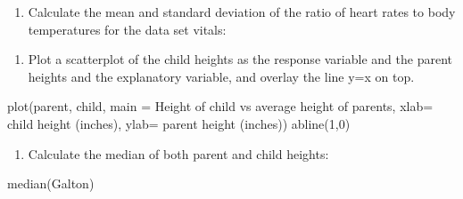 \documentclass[
  letterpaper,
  DIV=11,
  numbers=noendperiod]{scrreprt}
\newenvironment{Shaded}{\begin{snugshade}}{\end{snugshade}}
\newcommand{\AttributeTok}[1]{\textcolor[rgb]{0.40,0.45,0.13}{#1}}
\newcommand{\DecValTok}[1]{\textcolor[rgb]{0.68,0.00,0.00}{#1}}
\newcommand{\FunctionTok}[1]{\textcolor[rgb]{0.28,0.35,0.67}{#1}}
\newcommand{\NormalTok}[1]{\textcolor[rgb]{0.00,0.23,0.31}{#1}}
\newcommand{\SpecialCharTok}[1]{\textcolor[rgb]{0.37,0.37,0.37}{#1}}
\newcommand{\StringTok}[1]{\textcolor[rgb]{0.13,0.47,0.30}{#1}}
\providecommand{\tightlist}{%
  \setlength{\itemsep}{0pt}\setlength{\parskip}{0pt}}\usepackage{longtable,booktabs,array}
\begin{document}
\begin{enumerate}
\def\labelenumi{\arabic{enumi}.}
\setcounter{enumi}{1}
\tightlist
\item
  Calculate the mean and standard deviation of the ratio of heart rates
  to body temperatures for the data set vitals:
\end{enumerate}

\begin{Shaded}
\end{Shaded}

\begin{enumerate}
\def\labelenumi{\arabic{enumi}.}
\setcounter{enumi}{2}
\tightlist
\item
  Plot a scatterplot of the child heights as the response variable and
  the parent heights and the explanatory variable, and overlay the line
  y=x on top.
\end{enumerate}

\begin{Shaded}
\begin{Highlighting}[]
\FunctionTok{plot}\NormalTok{(parent, child, }\AttributeTok{main =} \StringTok{\textquotesingle{}Height of child vs average height of parents\textquotesingle{}}\NormalTok{, }\AttributeTok{xlab=} \StringTok{\textquotesingle{}child height (inches)\textquotesingle{}}\NormalTok{, }\AttributeTok{ylab=} \StringTok{\textquotesingle{}parent height (inches)\textquotesingle{}}\NormalTok{)}
\FunctionTok{abline}\NormalTok{(}\DecValTok{1}\NormalTok{,}\DecValTok{0}\NormalTok{)}
\end{Highlighting}
\end{Shaded}

\begin{enumerate}
\def\labelenumi{\arabic{enumi}.}
\setcounter{enumi}{3}
\tightlist
\item
  Calculate the median of both parent and child heights:
\end{enumerate}

\begin{Shaded}
\begin{Highlighting}[]
\FunctionTok{median}\NormalTok{(Galton)}
\end{Highlighting}
\end{Shaded}
\end{document}

